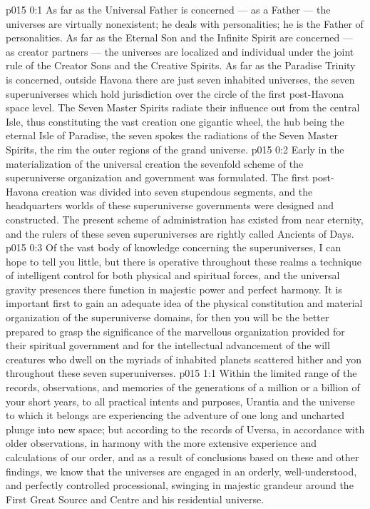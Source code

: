 \author{Universal Censor}
\vs p015 0:1 As far as the Universal Father is concerned --- as a Father --- the universes are virtually nonexistent; he deals with personalities; he is the Father of personalities. As far as the Eternal Son and the Infinite Spirit are concerned --- as creator partners --- the universes are localized and individual under the joint rule of the Creator Sons and the Creative Spirits. As far as the Paradise Trinity is concerned, outside Havona there are just seven inhabited universes, the seven superuniverses which hold jurisdiction over the circle of the first post\hyp{}Havona space level. The Seven Master Spirits radiate their influence out from the central Isle, thus constituting the vast creation one gigantic wheel, the hub being the eternal Isle of Paradise, the seven spokes the radiations of the Seven Master Spirits, the rim the outer regions of the grand universe.
\vs p015 0:2 Early in the materialization of the universal creation the sevenfold scheme of the superuniverse organization and government was formulated. The first post\hyp{}Havona creation was divided into seven stupendous segments, and the headquarters worlds of these superuniverse governments were designed and constructed. The present scheme of administration has existed from near eternity, and the rulers of these seven superuniverses are rightly called Ancients of Days.
\vs p015 0:3 Of the vast body of knowledge concerning the superuniverses, I can hope to tell you little, but there is operative throughout these realms a technique of intelligent control for both physical and spiritual forces, and the universal gravity presences there function in majestic power and perfect harmony. It is important first to gain an adequate idea of the physical constitution and material organization of the superuniverse domains, for then you will be the better prepared to grasp the significance of the marvellous organization provided for their spiritual government and for the intellectual advancement of the will creatures who dwell on the myriads of inhabited planets scattered hither and yon throughout these seven superuniverses.
\vs p015 1:1 Within the limited range of the records, observations, and memories of the generations of a million or a billion of your short years, to all practical intents and purposes, Urantia and the universe to which it belongs are experiencing the adventure of one long and uncharted plunge into new space; but according to the records of Uversa, in accordance with older observations, in harmony with the more extensive experience and calculations of our order, and as a result of conclusions based on these and other findings, we know that the universes are engaged in an orderly, well\hyp{}understood, and perfectly controlled processional, swinging in majestic grandeur around the First Great Source and Centre and his residential universe.
